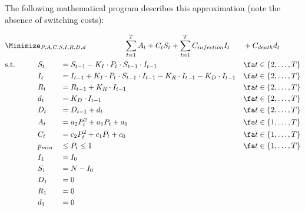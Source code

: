 \documentclass{article}
\begin{document}

The following mathematical program describes this approximation (note the absence of switching costs):

{\small
    \begin{alignat}{4}
        &\Minimize_{P,A,C,S,I,R,D,d}\qquad \span\span\span\span\sum_{t=1}^{T}A_t + C_{t} S_{t}  + \sum_{t=1}^{T}C_{infection} I_t &&+ C_{death}  d_t \label{eq:quadratic_approx}\\
        & \text{s.t.}\qquad  && S_t &&= S_{t-1} - K_I \cdot P_t \cdot S_{t-1} \cdot I_{t-1} && \fa t \in \{2,\ldots,T\} \nonumber\\
        & {} && I_t &&= I_{t-1} + K_I \cdot P_t \cdot S_{t-1} \cdot I_{t-1} - K_R\cdot I_{t-1} - K_D \cdot I_{t-1} && \fa t \in \{2,\ldots,T\} \nonumber\\
        & {} && R_t &&= R_{t-1} + K_R \cdot I_{t-1} && \fa t \in \{2,\ldots,T\} \nonumber\\
        & {} && d_t &&= K_D \cdot I_{t-1} && \fa t \in \{2,\ldots,T\} \nonumber\\
        & {} && D_t &&= D_{t-1} + d_t && \fa t \in \{2,\ldots,T\} \nonumber\\
        & {} && A_t &&=  a_2 P_t^2 + a_1 P_t + a_0&& \fa t \in \{1,\ldots,T\} \nonumber\\
        & {} && C_t &&= c_2 P_t^2 + c_1 P_t + c_0&& \fa t \in \{1,\ldots,T\} \nonumber\\
        & {} && p_{min} &&\le P_t \le 1&& \fa t \in \{1,\ldots,T\} \nonumber\\
        & {} && I_1 &&= I_0 && \nonumber\\
        & {} && S_1 &&= N - I_0 && \nonumber\\
        & {} && D_1 &&= 0 && \nonumber\\
        & {} && R_1 &&= 0 && \nonumber\\
        & {} && d_1 &&= 0 && \nonumber
    \end{alignat}
}
\end{document}

